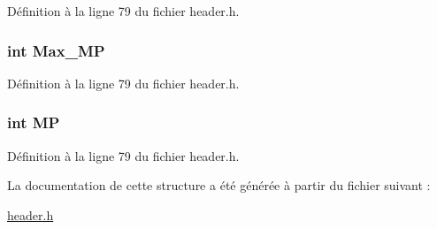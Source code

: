 Définition à la ligne 79 du fichier header.\-h.

\hypertarget{structt__status_a5e48a681ff3d92aaa0e643fbc32ab2f7}{
\subsubsection[{Max\-\_\-\-M\-P}]{\setlength{\rightskip}{0pt plus 5cm}int Max\-\_\-\-M\-P}}\label{structt__status_a5e48a681ff3d92aaa0e643fbc32ab2f7}


Définition à la ligne 79 du fichier header.\-h.

\hypertarget{structt__status_a30fc75b90111fc791752dd1add6ed991}{
\subsubsection[{M\-P}]{\setlength{\rightskip}{0pt plus 5cm}int M\-P}}\label{structt__status_a30fc75b90111fc791752dd1add6ed991}


Définition à la ligne 79 du fichier header.\-h.



La documentation de cette structure a été générée à partir du fichier suivant \-:\begin{DoxyCompactItemize}
\item 
\hyperlink{header_8h}{header.\-h}\end{DoxyCompactItemize}

